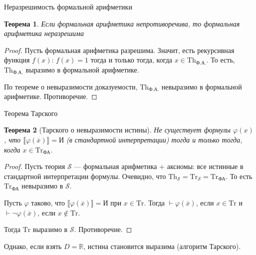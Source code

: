 \documentclass[aspectratio=169]{beamer}
\newtheorem{thm}{Теорема}[section]
\begin{document}
\begin{frame}{Неразрешимость формальной арифметики}
\begin{thm}Если формальная арифметика непротиворечива, то формальная арифметика неразрешима\end{thm}
\begin{proof}
Пусть формальная арифметика разрешима. 
Значит, есть рекурсивная функция $f(x)$: $f(x)=1$ тогда и только тогда, 
когда $x \in \text{Th}_\text{Ф.А.}$. То есть, $\text{Th}_\text{Ф.А.}$ выразимо в формальной арифметике.

По теореме о невыразимости доказуемости, 
$\text{Th}_\text{Ф.А.}$ невыразимо в формальной арифметике. Противоречие.
\end{proof}
\end{frame}

\begin{frame}{Теорема Тарского}
\begin{thm}[Тарского о невыразимости истины]
Не существует формулы $\varphi(x)$, что $\llbracket \varphi(\overline{x}) \rrbracket = \text{И}$ (в стандартной интерпретации) тогда и только
тогда, когда $x \in \text{Tr}_\text{ФА}$. \end{thm}
\begin{proof}
Пусть теория $\mathcal{S}$ --- формальная арифметика + аксиомы: все истинные в стандартной интерпретации формулы.
Очевидно, что $\text{Th}_\mathcal{S} = \text{Tr}_\mathcal{S} = \text{Tr}_\text{ФА}$. 
То есть $\text{Tr}_\text{ФА}$ невыразимо в $\mathcal{S}$.

Пусть $\varphi$ таково, что $\llbracket\varphi(\overline{x})\rrbracket = \text{И}$ при $x \in \text{Tr}$.
Тогда $\vdash\varphi(\overline{x})$, если $x \in \text{Tr}$ и $\vdash\neg\varphi(\overline{x})$, если $x \notin\text{Tr}$.

Тогда $\text{Tr}$ выразимо в $\mathcal{S}$. Противоречие.
\end{proof}

\pause
Однако, если взять $D = \mathbb{R}$, истина становится выразима (алгоритм Тарского).
\end{frame}
\end{document}
